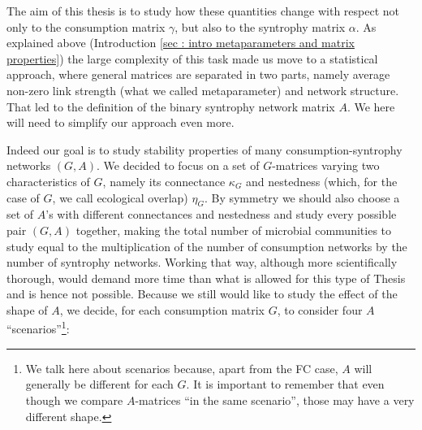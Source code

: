 \documentclass[12pt]{report}
\begin{document}
The aim of this thesis is to study how these quantities change with respect not only to the consumption matrix $\gamma$, but also to the syntrophy matrix $\alpha$. As explained above (Introduction \ref{sec : intro metaparameters and matrix properties}) the large complexity of this task made us move to a statistical approach, where general matrices are separated in two parts, namely average non-zero link strength (what we called metaparameter) and network structure. That led to the definition of the binary syntrophy network matrix $A$. We here will need to simplify our approach even more.

Indeed our goal is to study stability properties of many consumption-syntrophy networks $(G,A)$. We decided to focus on a set of $G$-matrices varying two characteristics of $G$, namely its connectance $\kappa_G$ and nestedness (which, for the case of $G$, we call ecological overlap) $\eta_G$. By symmetry we should also choose a set of $A$'s with different connectances and nestedness and study every possible pair $(G,A)$ together, making the total number of microbial communities to study equal to the multiplication of the number of consumption networks by the number of syntrophy networks. Working that way, although more scientifically thorough, would demand more time than what is allowed for this type of Thesis and is hence not possible. Because we still would like to study the effect of the shape of $A$, we decide, for each consumption matrix $G$, to consider four $A$ ``scenarios''\footnote{We talk here about scenarios because, apart from the FC case, $A$ will generally be different for each $G$. It is important to remember that even though we compare $A$-matrices ``in the same scenario'', those may have a very different shape.}:
\end{document}
